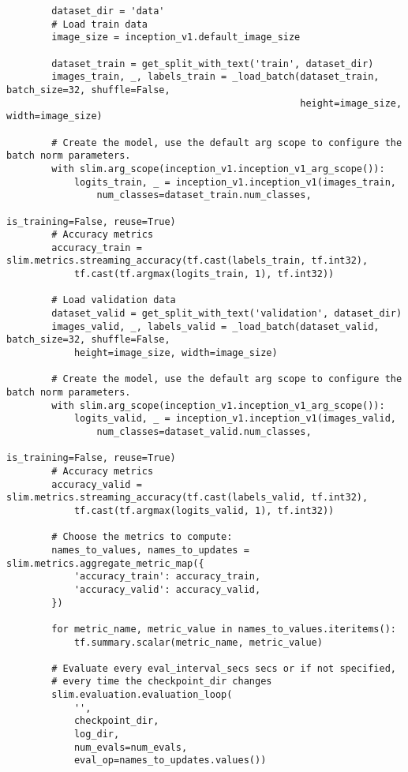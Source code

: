 \begin{lstlisting}
        dataset_dir = 'data'
        # Load train data
        image_size = inception_v1.default_image_size

        dataset_train = get_split_with_text('train', dataset_dir)
        images_train, _, labels_train = _load_batch(dataset_train, batch_size=32, shuffle=False, 
                                                    height=image_size, width=image_size)

        # Create the model, use the default arg scope to configure the batch norm parameters.
        with slim.arg_scope(inception_v1.inception_v1_arg_scope()):
            logits_train, _ = inception_v1.inception_v1(images_train, 
                num_classes=dataset_train.num_classes, 
                                                        is_training=False, reuse=True)
        # Accuracy metrics
        accuracy_train = slim.metrics.streaming_accuracy(tf.cast(labels_train, tf.int32),
            tf.cast(tf.argmax(logits_train, 1), tf.int32))

        # Load validation data
        dataset_valid = get_split_with_text('validation', dataset_dir)
        images_valid, _, labels_valid = _load_batch(dataset_valid, batch_size=32, shuffle=False, 
            height=image_size, width=image_size)

        # Create the model, use the default arg scope to configure the batch norm parameters.
        with slim.arg_scope(inception_v1.inception_v1_arg_scope()):
            logits_valid, _ = inception_v1.inception_v1(images_valid, 
                num_classes=dataset_valid.num_classes, 
                                                        is_training=False, reuse=True)
        # Accuracy metrics
        accuracy_valid = slim.metrics.streaming_accuracy(tf.cast(labels_valid, tf.int32), 
            tf.cast(tf.argmax(logits_valid, 1), tf.int32))

        # Choose the metrics to compute:
        names_to_values, names_to_updates = slim.metrics.aggregate_metric_map({
            'accuracy_train': accuracy_train,
            'accuracy_valid': accuracy_valid,
        })

        for metric_name, metric_value in names_to_values.iteritems():
            tf.summary.scalar(metric_name, metric_value)

        # Evaluate every eval_interval_secs secs or if not specified,
        # every time the checkpoint_dir changes
        slim.evaluation.evaluation_loop(
            '',
            checkpoint_dir,
            log_dir,
            num_evals=num_evals,
            eval_op=names_to_updates.values())


\end{lstlisting}
